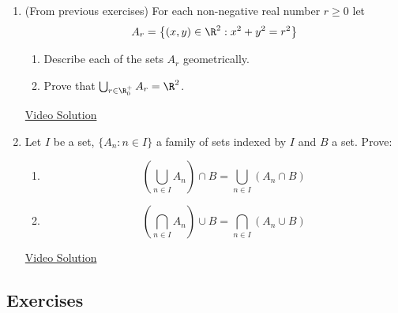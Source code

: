 \begin{enumerate}\renewcommand{\labelenumi}{\thesubsection.\theenumi}
\item (From previous exercises) For each non-negative real number $r\ge 0$ let 
  \[A_r=\big\{(x,y)\in\R^2:x^2+y^2=r^2\big\}\]
		\begin{enumerate}
  		\item Describe each of the sets $A_r$ geometrically.
  		\item Prove that $\bigcup_{r\in\R^+_0}A_r=\R^2$.
		\end{enumerate}
		
		\href{https://youtu.be/WuSucjuxjbU}{Video Solution}
		
\item Let $I$ be a set, $\{A_n : n \in I\}$ a family of sets indexed by $I$ and $B$ a set. Prove:
\begin{enumerate}
    \item \[ \left(\bigcup_{n \in I} A_n \right) \cap B = \bigcup_{n \in I} (A_n \cap B) \]
    \item \[ \left(\bigcap_{n \in I} A_n \right) \cup B = \bigcap_{n \in I} (A_n \cup B) \]
\end{enumerate}

\href{https://youtu.be/CtIg2lrsyAs}{Video Solution}

\end{enumerate}

\subsection*{Exercises}

